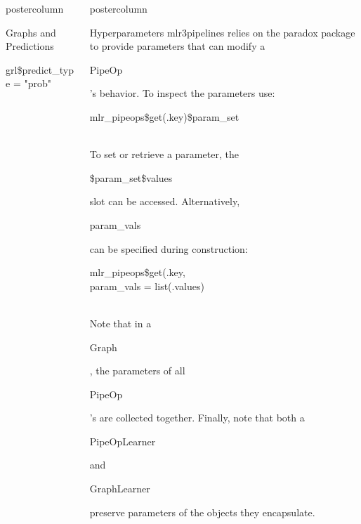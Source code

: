 \documentclass{beamer}
\newlength{\columnheight} %
\newcommand{\codeinline}[1]{\begin{codeboxinline}#1\end{codeboxinline}}
\begin{document}
\begin{frame}[fragile]{}
\begin{columns}
\begin{column}{.245\textwidth}
\begin{beamercolorbox}[center]{postercolumn}
\begin{minipage}{.98\textwidth}
{\begin{myblock}{Graphs and Predictions}
              \begin{codebox}
                grl\$predict\_type = "prob"
              \end{codebox}
            \end{myblock}
						\vfill}
				\end{minipage}
			\end{beamercolorbox}
		\end{column}
    \begin{column}{.245\textwidth}
			\begin{beamercolorbox}[center]{postercolumn}
				\begin{minipage}{.98\textwidth}
					\parbox[t][\columnheight]{\textwidth}{
            \begin{myblock}{Hyperparameters}
              mlr3pipelines relies on the paradox package to provide parameters that can modify a \codeinline{PipeOp}'s behavior. To inspect the parameters use:
              \begin{codebox}
                mlr\_pipeops\$get(.key)\$param\_set
              \end{codebox}
              \ \\
              To set or retrieve a parameter, the \codeinline{\$param\_set\$values} slot can be accessed. Alternatively, \codeinline{param\_vals} can be specified during construction:
              \begin{codeboxmultiline}[width=17cm]
                mlr\_pipeops\$get(.key,\\
                \hspace*{1ex}param\_vals = list(.values)
              \end{codeboxmultiline}
              \ \\
              Note that in a \codeinline{Graph}, the parameters of all \codeinline{PipeOp}'s are collected together.
              Finally, note that both a \codeinline{PipeOpLearner} and \codeinline{GraphLearner} preserve parameters of the objects they encapsulate.
            \end{myblock}
						\vfill}
				\end{minipage}
			\end{beamercolorbox}
		\end{column}
	\end{columns}
\end{frame}
\end{document}
